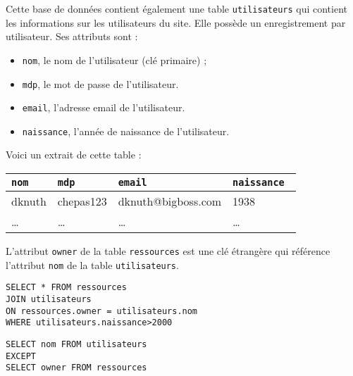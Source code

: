 \documentclass[11pt,a4paper]{article}
\begin{document}
\begin{Exercise*}[title = type A]
	\NRet
	Cette base de données contient également une table {\tt utilisateurs} qui contient les informations sur les utilisateurs du site. Elle possède un enregistrement par utilisateur. Ses attributs sont :
	\begin{itemize}
		\item {\tt nom}, le nom de l'utilisateur (clé primaire) ;
		\item {\tt mdp}, le mot de passe de l'utilisateur.
		\item {\tt email}, l'adresse email de l'utilisateur.
		\item {\tt naissance}, l'année de naissance de l'utilisateur.
	\end{itemize}
	Voici un extrait de cette table :
	\medskip
	\begin{center}
		\begin{tabular}{|l|l|l|l|}
			\hline
			{\tt nom} & {\tt mdp} & {\tt email}        & {\tt naissance } \\
			\hline
			dknuth    & chepas123 & dknuth@bigboss.com & 1938             \\
			\hline
			\dots     & \dots     & \dots              & \dots            \\
		\end{tabular}
	\end{center}
	L'attribut {\tt owner} de la table {\tt ressources} est une clé étrangère qui référence l'attribut {\tt nom} de la table {\tt utilisateurs}.
	\Ret
	\ifcorrige
		\begin{verbatim}
SELECT * FROM ressources
JOIN utilisateurs
ON ressources.owner = utilisateurs.nom
WHERE utilisateurs.naissance>2000
\end{verbatim}
	\fi
	\ifcorrige
		\begin{verbatim}
SELECT nom FROM utilisateurs
EXCEPT 
SELECT owner FROM ressources
\end{verbatim}
	\fi
\end{Exercise*}
\end{document}

